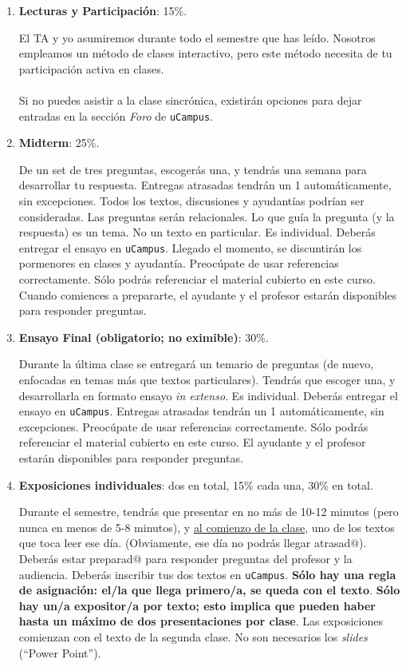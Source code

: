 \documentclass[letterpaper]{article}
\begin{document}
\begin{enumerate}

	\item {\bf Lecturas y Participaci\'on}: 15\%.

		El TA y yo asumiremos durante todo el semestre que has le\'ido. Nosotros empleamos un m\'etodo de clases interactivo, pero este m\'etodo necesita de tu participaci\'on activa en clases.
		\\
		\\	
		Si no puedes asistir a la clase sincr\'onica, existir\'an opciones para dejar entradas en la secci\'on \emph{Foro} de \texttt{uCampus}.
	
  \item {\bf Midterm}: 25\%.

		De un set de tres preguntas, escoger\'as una, y tendr\'as una semana para desarrollar tu respuesta. Entregas atrasadas tendr\'an un 1 autom\'aticamente, sin excepciones. Todos los textos, discusiones y ayudant\'ias podr\'ian ser consideradas. Las preguntas ser\'an relacionales. Lo que gu\'ia la pregunta (y la respuesta) es un tema. No un texto en particular. Es individual. Deber\'as entregar el ensayo en \texttt{uCampus}. Llegado el momento, se discuntir\'an los pormenores en clases y ayudant\'ia. Preoc\'upate de usar referencias correctamente. S\'olo podr\'as referenciar el material cubierto en este curso. Cuando comiences a prepararte, el ayudante y el profesor estar\'an disponibles para responder preguntas.

	\item {\bf Ensayo Final (obligatorio; no eximible)}: 30\%. 

	Durante la \'ultima clase se entregar\'a un temario de preguntas (de nuevo, enfocadas en temas m\'as que textos particulares). Tendr\'as que escoger una, y desarrollarla en formato ensayo \emph{in extenso}. Es individual. Deber\'as entregar el ensayo en \texttt{uCampus}. Entregas atrasadas tendr\'an un 1 autom\'aticamente, sin excepciones. Preoc\'upate de usar referencias correctamente. S\'olo podr\'as referenciar el material cubierto en este curso. El ayudante y el profesor estar\'an disponibles para responder preguntas.

	\item {\bf Exposiciones individuales}: dos en total, 15\% cada una, 30\% en total.

	Durante el semestre, tendr\'as que presentar en no m\'as de 10-12 minutos (pero nunca en menos de 5-8 minutos), y \underline{al comienzo de la clase}, uno de los textos que toca leer ese d\'ia. (Obviamente, ese d\'ia no podr\'as llegar atrasad$@$). Deber\'as estar preparad$@$ para responder preguntas del profesor y la audiencia. Deber\'as inscribir tus dos textos en \texttt{uCampus}. {\bf S\'olo hay una regla de asignaci\'on: el/la que llega primero/a, se queda con el texto}. {\bf S\'olo hay un/a expositor/a por texto; esto implica que pueden haber hasta un m\'aximo de dos presentaciones por clase}. Las exposiciones comienzan con el texto de la segunda clase. No son necesarios los \emph{slides} (``Power Point''). 


\end{enumerate}
\end{document}
